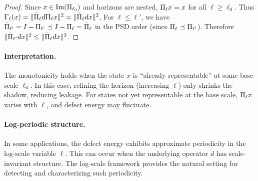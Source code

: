 \begin{proof}
Since $x \in \mathrm{Im}(\Pi_{\ell_0})$ and horizons are nested, $\Pi_{\ell} x = x$ for all $\ell \ge \ell_0$.
Thus $\Gamma_{\ell}(x) = \|\bar{\Pi}_{\ell} d \Pi_{\ell} x\|^2 = \|\bar{\Pi}_{\ell} d x\|^2$.
For $\ell \le \ell'$, we have $\bar{\Pi}_{\ell'} = I - \Pi_{\ell'} \preceq I - \Pi_{\ell} = \bar{\Pi}_{\ell}$ in the PSD order (since $\Pi_{\ell} \preceq \Pi_{\ell'}$).
Therefore $\|\bar{\Pi}_{\ell'} d x\|^2 \le \|\bar{\Pi}_{\ell} d x\|^2$.
\end{proof}

\paragraph{Interpretation.}
The monotonicity holds when the state $x$ is ``already representable'' at some base scale $\ell_0$.
In this case, refining the horizon (increasing $\ell$) only shrinks the shadow, reducing leakage.
For states not yet representable at the base scale, $\Pi_{\ell} x$ varies with $\ell$, and defect energy may fluctuate.

\paragraph{Log-periodic structure.}
In some applications, the defect energy exhibits approximate periodicity in the log-scale variable $\ell$.
This can occur when the underlying operator $d$ has scale-invariant structure.
The log-scale framework provides the natural setting for detecting and characterizing such periodicity.
